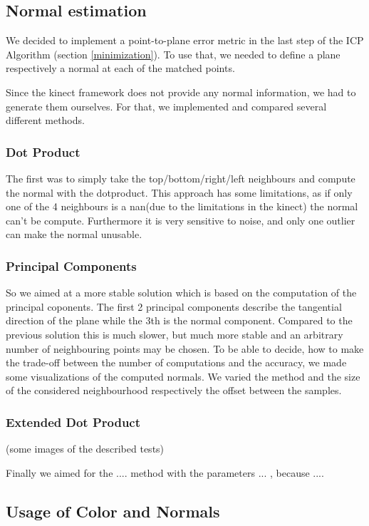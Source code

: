 \documentclass[twocolumn]{article}
\begin{document}
\subsection{Normal estimation}

We decided to implement a point-to-plane error metric in the last step of the ICP Algorithm (section \ref{minimization}). To use that, we needed to define a plane respectively a normal at each of the matched points.

Since the kinect framework does not provide any normal information, we had to generate them ourselves. For that, we implemented and compared several different methods.

\subsubsection{Dot Product}
The first was to simply take the top/bottom/right/left neighbours and compute the normal with the dotproduct.
This approach has some limitations, as if only one of the 4 neighbours is a nan(due to the limitations in the kinect) the normal can't be compute. Furthermore it is very sensitive to noise, and only one outlier can make the normal unusable.

\subsubsection{Principal Components}
So we aimed at a more stable solution which is based on the computation of the principal coponents. 
The first 2 principal components describe the tangential direction of the plane while the 3th is the normal component.
Compared to the previous solution this is much slower, but much more stable and an arbitrary number of neighbouring points may be chosen.
To be able to decide, how to make the trade-off between the number of computations and the accuracy, we made some visualizations of the computed normals.
We varied the method and the size of the considered neighbourhood respectively the offset between the samples.

\subsubsection{Extended Dot Product}

(some images of the described tests)

Finally we aimed for the .... method with the parameters ... , because ....

\subsection{Usage of Color and Normals}
\end{document}

